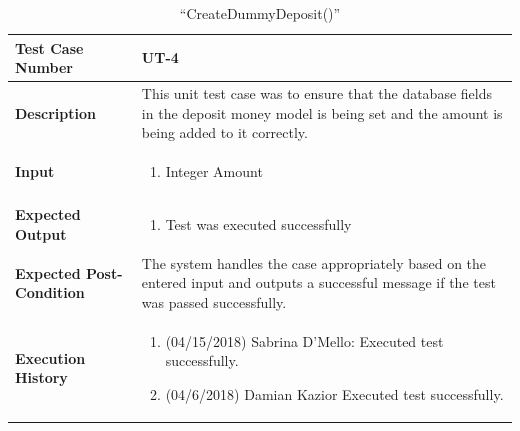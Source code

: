 \documentclass[12pt]{article}
\begin{document}
\begin{table}[H]
\caption{“CreateDummyDeposit()”}
\begin{center}
\begin{tabular}{|p{5.5cm}|p{11cm}|}
  \hline
  \bf Test Case Number & UT-4\\\hline
  \bf Description & 
This unit test case was to ensure that the database fields in the deposit money model is being set and the amount is being added to it correctly.\\\hline
  \bf Input &
  \begin{enumerate}
  \item Integer Amount
  \end{enumerate}
  \\\hline
  \bf Expected Output &
  \begin{enumerate}
  \item Test was executed successfully
  \end{enumerate}
  \\\hline
  \bf Expected Post-Condition & 
  The system handles the case appropriately based on the entered input and outputs a successful message if the test was passed successfully.
  \\\hline   
  \bf Execution History & 
  \begin{enumerate}
  \item (04/15/2018) Sabrina D’Mello: Executed test successfully.
  \item (04/6/2018) Damian Kazior Executed test successfully.
  \end{enumerate}
  \\\hline
\end{tabular}
\end{center}
\end{table}
\end{document}
